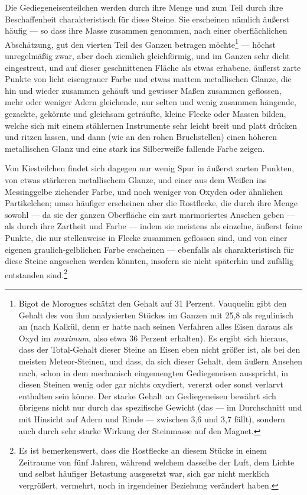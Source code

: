 \documentclass[a4paper, 11pt, oneside, german]{article}
\begin{document}
Die Gediegeneisenteilchen werden durch ihre Menge und zum Teil durch ihre Beschaffenheit charakteristisch für diese Steine. Sie erscheinen nämlich äußerst häufig --- so dass ihre Masse zusammen genommen, nach einer oberflächlichen Abschätzung, gut den vierten Teil des Ganzen betragen möchte\footnote{Bigot de Morogues schätzt den Gehalt auf 31 Perzent. Vauquelin gibt den Gehalt des von ihm analysierten Stückes im Ganzen mit 25,8 als regulinisch an (nach Kalkül, denn er hatte nach seinen Verfahren alles Eisen daraus als Oxyd im \emph{maximum}, also etwa 36 Perzent erhalten). Es ergibt sich hieraus, dass der Total-Gehalt dieser Steine an Eisen eben nicht größer ist, als bei den meisten Meteor-Steinen, und dass, da sich dieser Gehalt, dem äußern Ansehen nach, schon in dem mechanisch eingemengten Gediegeneisen ausspricht, in diesen Steinen wenig oder gar nichts oxydiert, vererzt oder sonst verlarvt enthalten sein könne. Der starke Gehalt an Gediegeneisen bewährt sich übrigens nicht nur durch das spezifische Gewicht (das --- im Durchschnitt und mit Hinsicht auf Adern und Rinde --- zwischen 3,6 und 3,7 fällt), sondern auch durch sehr starke Wirkung der Steinmasse auf den Magnet.} --- höchst unregelmäßig zwar, aber doch ziemlich gleichförmig, und im Ganzen sehr dicht eingestreut, und auf dieser geschnittenen Fläche als etwas erhabene, äußerst zarte Punkte von licht eisengrauer Farbe und etwas mattem metallischen Glanze, die hin und wieder zusammen gehäuft und gewisser Maßen zusammen geflossen, mehr oder weniger Adern gleichende, nur selten und wenig zusammen hängende, gezackte, gekörnte und gleichsam geträufte, kleine Flecke oder Massen bilden, welche sich mit einem stählernen Instrumente sehr leicht breit und platt drücken und ritzen lassen, und dann (wie an den rohen Bruchstellen) einen höheren metallischen Glanz und eine stark ins Silberweiße fallende Farbe zeigen.

Von Kiesteilchen findet sich dagegen nur wenig Spur in äußerst zarten Punkten, von etwas stärkeren metallischem Glanze, und einer aus dem Weißen ins Messinggelbe ziehender Farbe, und noch weniger von Oxyden oder ähnlichen Partikelchen; umso häufiger erscheinen aber die Rostflecke, die durch ihre Menge sowohl --- da sie der ganzen Oberfläche ein zart marmoriertes Ansehen geben --- als durch ihre Zartheit und Farbe --- indem sie meistens als einzelne, äußerst feine Punkte, die nur stellenweise in Flecke zusammen geflossen sind, und von einer eigenen graulich-gelblichen Farbe erscheinen --- ebenfalls als charakteristisch für diese Steine angesehen werden könnten, insofern sie nicht späterhin und zufällig entstanden sind.\footnote{Es ist bemerkenswert, dass die Rostflecke an diesem Stücke in einem Zeitraume von fünf Jahren, während welchem dasselbe der Luft, dem Lichte und selbst häufiger Betastung ausgesetzt war, sich gar nicht merklich vergrößert, vermehrt, noch in irgendeiner Beziehung verändert haben.}
\end{document}
